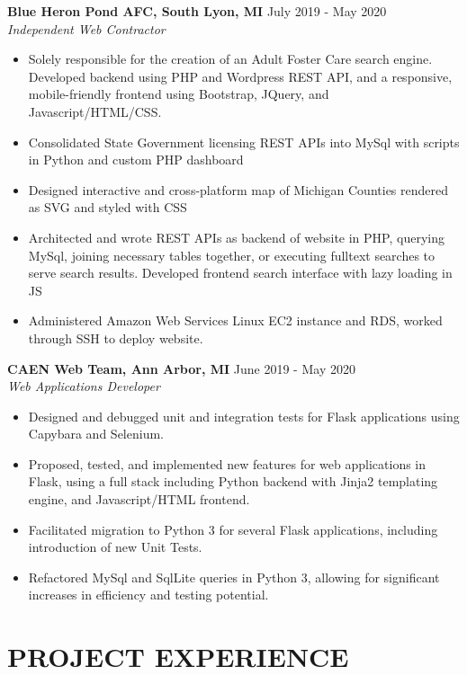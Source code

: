 \documentclass[overlapped]{res}
\begin{document}
\begin{resume}
    \textbf{Blue Heron Pond AFC, South Lyon, MI}
    \hfill July 2019 - May 2020 \\
    {\sl Independent Web Contractor}
    \begin{itemize}  \itemsep -2pt %
        \item Solely responsible for the creation of an Adult Foster Care search engine.
              Developed backend using PHP and Wordpress REST API, and a responsive, mobile-friendly frontend using Bootstrap, JQuery, and Javascript/HTML/CSS.
        \item Consolidated State Government licensing REST APIs into MySql with scripts in Python and custom PHP dashboard
        \item Designed interactive and cross-platform map of Michigan Counties rendered as SVG and styled with CSS
        \item Architected and wrote REST APIs as backend of website in PHP, querying MySql, joining necessary tables together, or executing fulltext searches to serve search results. Developed frontend search interface with lazy loading in JS
        \item Administered Amazon Web Services Linux EC2 instance and RDS, worked through SSH to deploy website.
    \end{itemize}
    
    \textbf{CAEN Web Team, Ann Arbor, MI}
    \hfill June 2019 - May 2020 \\
    {\sl Web Applications Developer}
    \begin{itemize}  \itemsep -2pt %
        \item Designed and debugged unit and integration tests for Flask applications using Capybara and Selenium.
        \item Proposed, tested, and implemented new features for web applications in Flask, using a full stack including Python backend with Jinja2 templating engine, and Javascript/HTML frontend.
        \item Facilitated migration to Python 3 for several Flask applications, including introduction of new Unit Tests.
        \item Refactored MySql and SqlLite queries in Python 3, allowing for significant increases in efficiency and testing potential.

    \end{itemize}
    
    \section{PROJECT EXPERIENCE}
    

\end{resume}
\end{document}
